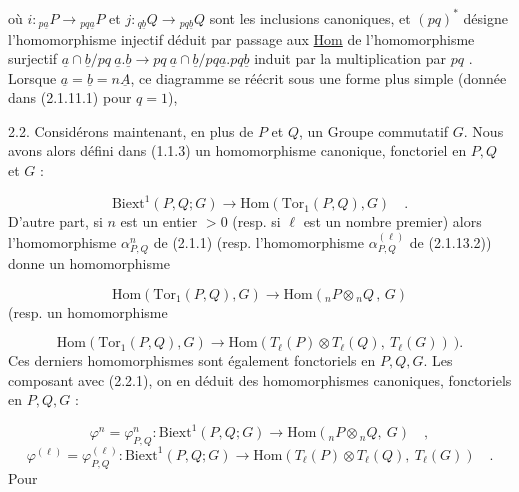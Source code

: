 où $i : {}_{p\underline{a}}P \longrightarrow {}_{pq\underline{a}}P$ et $j : {}_{q\underline{b}}Q \longrightarrow {}_{pq\underline{b}}Q$ sont les inclusions canoniques, et $(pq)^{*}$ désigne l'homomorphisme injectif déduit par passage aux \underline{Hom} de l'homomorphisme surjectif $\underline{a}\cap\underline{b}/pq\ \underline{a}.\underline{b} \longrightarrow pq\ \underline{a}\cap\underline{b}/pq\underline{a}.pq\underline{b}$ induit par la multiplication par $pq$ . Lorsque $\underline{a} = \underline{b} = n\underline{A}$, ce diagramme se réécrit sous une forme plus simple (donnée dans (2.1.11.1) pour $q = 1$),

2.2. Considérons maintenant, en plus de $P$ et $Q$, un Groupe commutatif $G$. Nous avons alors défini dans (1.1.3) un homomorphisme canonique, fonctoriel en $P,Q$ et $G$ :

\begin{equation}\tag{2.2.1}
\mathrm{Biext}^1(P,Q;G) \longrightarrow \mathrm{Hom}(\mathrm{Tor}_1(P,Q),G) \quad .
\end{equation}
D'autre part, si $n$ est un entier $> 0$ (resp. si $\ell$ est un nombre premier) alors l'homomorphisme $\alpha^n_{P,Q}$ de (2.1.1) (resp. l'homomorphisme $\alpha^{(\ell)}_{P,Q}$ de (2.1.13.2)) donne un homomorphisme

\begin{equation*}
\mathrm{Hom}(\mathrm{Tor}_1(P,Q),G) \longrightarrow \mathrm{Hom}({}_nP \otimes {}_nQ \, , \, G)
\end{equation*}
(resp. un homomorphisme

\begin{equation*}
\mathrm{Hom}(\mathrm{Tor}_1(P,Q),G) \longrightarrow \mathrm{Hom}(T_{\ell}(P) \otimes T_{\ell}(Q), \ T_{\ell}(G)) \ ).
\end{equation*}
Ces derniers homomorphismes sont également fonctoriels en $P,Q,G$. Les composant avec (2.2.1), on en déduit des homomorphismes canoniques, fonctoriels en $P,Q,G$ :

\begin{equation}\tag{2.2.2}
\varphi^n = \varphi^n_{P,Q} : \mathrm{Biext}^1(P,Q;G) \longrightarrow \mathrm{Hom}({}_nP{\otimes}{}_nQ, \ G) \quad ,
\end{equation}
\begin{equation}\tag{2.2.3}
\varphi^{(\ell)} = \varphi^{(\ell)}_{P,Q} : \mathrm{Biext}^1(P,Q;G) \longrightarrow \mathrm{Hom}(T_{\ell}(P){\otimes}T_{\ell}(Q), \ T_{\ell}(G)) \quad .
\end{equation}
Pour

